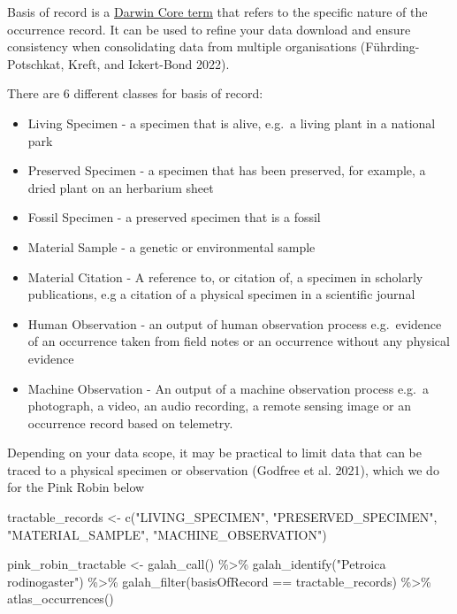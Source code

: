 \documentclass[
  letterpaper,
  DIV=11,
  numbers=noendperiod,
  oneside]{scrreprt}
\newenvironment{Shaded}{\begin{snugshade}}{\end{snugshade}}
\newcommand{\FunctionTok}[1]{\textcolor[rgb]{0.28,0.35,0.67}{#1}}
\newcommand{\NormalTok}[1]{\textcolor[rgb]{0.00,0.23,0.31}{#1}}
\newcommand{\OtherTok}[1]{\textcolor[rgb]{0.00,0.23,0.31}{#1}}
\newcommand{\SpecialCharTok}[1]{\textcolor[rgb]{0.37,0.37,0.37}{#1}}
\newcommand{\StringTok}[1]{\textcolor[rgb]{0.13,0.47,0.30}{#1}}
\providecommand{\tightlist}{%
  \setlength{\itemsep}{0pt}\setlength{\parskip}{0pt}}\usepackage{longtable,booktabs,array}
\begin{document}
Basis of record is a
\href{https://dwc.tdwg.org/terms/\#dwc:basisOfRecord}{Darwin Core term}
that refers to the specific nature of the occurrence record. It can be
used to refine your data download and ensure consistency when
consolidating data from multiple organisations (Führding-Potschkat,
Kreft, and Ickert-Bond 2022).

There are 6 different classes for basis of record:

\begin{itemize}
\tightlist
\item
  Living Specimen - a specimen that is alive, e.g.~a living plant in a
  national park
\item
  Preserved Specimen - a specimen that has been preserved, for example,
  a dried plant on an herbarium sheet
\item
  Fossil Specimen - a preserved specimen that is a fossil
\item
  Material Sample - a genetic or environmental sample
\item
  Material Citation - A reference to, or citation of, a specimen in
  scholarly publications, e.g a citation of a physical specimen in a
  scientific journal
\item
  Human Observation - an output of human observation process
  e.g.~evidence of an occurrence taken from field notes or an occurrence
  without any physical evidence
\item
  Machine Observation - An output of a machine observation process
  e.g.~a photograph, a video, an audio recording, a remote sensing image
  or an occurrence record based on telemetry.
\end{itemize}

Depending on your data scope, it may be practical to limit data that can
be traced to a physical specimen or observation (Godfree et al. 2021),
which we do for the Pink Robin below

\begin{Shaded}
\begin{Highlighting}[]
\NormalTok{tractable\_records }\OtherTok{\textless{}{-}} \FunctionTok{c}\NormalTok{(}\StringTok{"LIVING\_SPECIMEN"}\NormalTok{, }
                       \StringTok{"PRESERVED\_SPECIMEN"}\NormalTok{, }
                       \StringTok{"MATERIAL\_SAMPLE"}\NormalTok{, }
                       \StringTok{"MACHINE\_OBSERVATION"}\NormalTok{)}

\NormalTok{pink\_robin\_tractable }\OtherTok{\textless{}{-}} \FunctionTok{galah\_call}\NormalTok{() }\SpecialCharTok{\%\textgreater{}\%} 
  \FunctionTok{galah\_identify}\NormalTok{(}\StringTok{"Petroica rodinogaster"}\NormalTok{) }\SpecialCharTok{\%\textgreater{}\%} 
  \FunctionTok{galah\_filter}\NormalTok{(basisOfRecord }\SpecialCharTok{==}\NormalTok{ tractable\_records) }\SpecialCharTok{\%\textgreater{}\%} 
  \FunctionTok{atlas\_occurrences}\NormalTok{()}
\end{Highlighting}
\end{Shaded}
\end{document}
